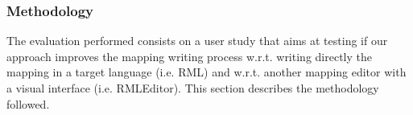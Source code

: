 
\subsubsection{Methodology}
\label{sec:chp5_mapeathor_eval_method}

The evaluation performed consists on a user study that aims at
testing if our approach improves the mapping writing process w.r.t. writing directly the mapping in a target language (i.e. RML) and w.r.t. another mapping editor with a visual interface (i.e. RMLEditor). This section describes the methodology followed.

